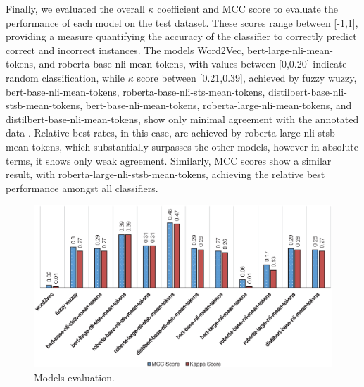 \documentclass{ieeeaccess}
\begin{document}
Finally, we evaluated the overall $\kappa$ coefficient and MCC score to evaluate the performance of each model on the test dataset. These scores range between [-1,1], providing a measure quantifying the accuracy of the classifier to correctly predict correct and incorrect instances. The models Word2Vec, bert-large-nli-mean-tokens, and roberta-base-nli-mean-tokens, with values between [0,0.20] indicate random classification, while $\kappa$ score between [0.21,0.39], achieved by fuzzy wuzzy, bert-base-nli-mean-tokens, roberta-base-nli-sts-mean-tokens, distilbert-base-nli-stsb-mean-tokens, bert-base-nli-mean-tokens, roberta-large-nli-mean-tokens, and distilbert-base-nli-mean-tokens, show only minimal agreement with the annotated data \cite{mchugh2012interrater}.  Relative best rates, in this case, are achieved by roberta-large-nli-stsb-mean-tokens, which substantially surpasses the other models, however in absolute terms, it shows only weak agreement. Similarly, MCC scores show a similar result, with roberta-large-nli-stsb-mean-tokens, achieving the relative best performance amongst all classifiers.

\begin{figure}[t!]
	\centering
	\includegraphics[scale=0.83]{evaluation}
	\caption{Models evaluation.}
	\label{fig:evaluation}
\end{figure}
\end{document}
